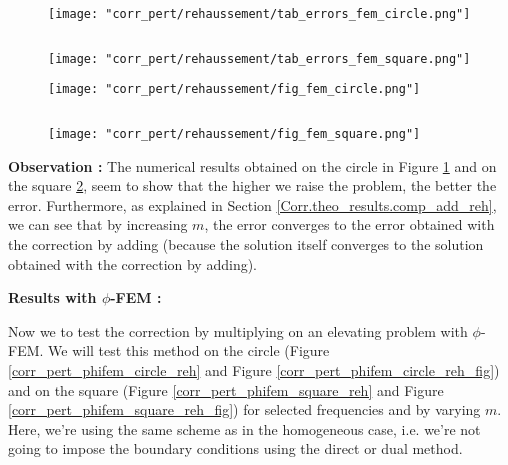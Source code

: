 \begin{minipage}{0.48\linewidth}
	\begin{figure}[H]
		\centering
		\texttt{[image: "corr\_pert/rehaussement/tab\_errors\_fem\_circle.png"]}
		\label{corr_pert_fem_circle_reh}
	\end{figure} 
\end{minipage} $\qquad$
\begin{minipage}{0.48\linewidth}
	\begin{figure}[H]
		\centering
		\texttt{[image: "corr\_pert/rehaussement/tab\_errors\_fem\_square.png"]}
		\label{corr_pert_fem_square_reh}
	\end{figure} 
\end{minipage}

\begin{minipage}{0.48\linewidth}
	\begin{figure}[H]
		\centering
		\texttt{[image: "corr\_pert/rehaussement/fig\_fem\_circle.png"]}
		\label{corr_pert_fem_circle_reh_fig}
	\end{figure} 
\end{minipage} $\qquad$
\begin{minipage}{0.48\linewidth}
	\begin{figure}[H]
		\centering
		\texttt{[image: "corr\_pert/rehaussement/fig\_fem\_square.png"]}
		\label{corr_pert_fem_square_reh_fig}
	\end{figure} 
\end{minipage}

\textbf{Observation :} The numerical results obtained on the circle in Figure \ref{corr_pert_fem_circle_reh} and on the square \ref{corr_pert_fem_square_reh}, seem to show that the higher we raise the problem, the better the error. Furthermore, as explained in Section \ref{Corr.theo_results.comp_add_reh}, we can see that by increasing $m$, the error converges to the error obtained with the correction by adding (because the solution itself converges to the solution obtained with the correction by adding). 

\textbf{Results with $\phi$-FEM :}

Now we to test the correction by multiplying on an elevating problem with $\phi$-FEM. We will test this method on the circle (Figure \ref{corr_pert_phifem_circle_reh} and Figure \ref{corr_pert_phifem_circle_reh_fig}) and on the square (Figure \ref{corr_pert_phifem_square_reh} and Figure \ref{corr_pert_phifem_square_reh_fig}) for selected frequencies and by varying $m$. Here, we're using the same scheme as in the homogeneous case, i.e. we're not going to impose the boundary conditions using the direct or dual method. 

